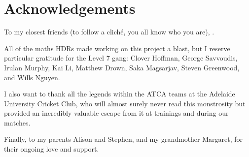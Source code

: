 \chapter{Acknowledgements}
\label{ch:acknowledgements}




To my closest friends (to follow a clich\'e, you all know who you are), .

All of the maths HDRs made working on this project a blast, but I reserve particular gratitude for the Level 7 gang: Clover Hoffman, George Savvoudis, Irulan Murphy, Kai Li, Matthew Drown, Saka Magsarjav, Steven Greenwood, and Wills Nguyen.



I also want to thank all the legends within the ATCA teams at the Adelaide University Cricket Club, who will almost surely never read this monstrosity but provided an incredibly valuable escape from it at trainings and during our matches.

Finally, to my parents Alison and Stephen, and my grandmother Margaret, for their ongoing love and support.
